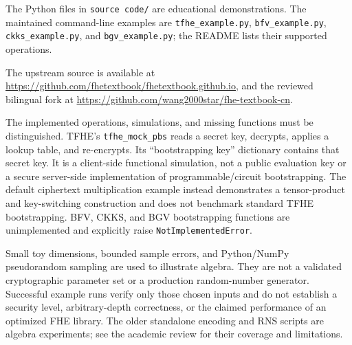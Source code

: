 The Python files in \texttt{source code/} are educational demonstrations. The maintained command-line examples are \texttt{tfhe\_example.py}, \texttt{bfv\_example.py}, \texttt{ckks\_example.py}, and \texttt{bgv\_example.py}; the README lists their supported operations.

The upstream source is available at \url{https://github.com/fhetextbook/fhetextbook.github.io}, and the reviewed bilingual fork at \url{https://github.com/wang2000star/fhe-textbook-cn}.

The implemented operations, simulations, and missing functions must be distinguished. TFHE's \texttt{tfhe\_mock\_pbs} reads a secret key, decrypts, applies a lookup table, and re-encrypts. Its ``bootstrapping key'' dictionary contains that secret key. It is a client-side functional simulation, not a public evaluation key or a secure server-side implementation of programmable/circuit bootstrapping. The default ciphertext multiplication example instead demonstrates a tensor-product and key-switching construction and does not benchmark standard TFHE bootstrapping. BFV, CKKS, and BGV bootstrapping functions are unimplemented and explicitly raise \texttt{NotImplementedError}.

Small toy dimensions, bounded sample errors, and Python/NumPy pseudorandom sampling are used to illustrate algebra. They are not a validated cryptographic parameter set or a production random-number generator. Successful example runs verify only those chosen inputs and do not establish a security level, arbitrary-depth correctness, or the claimed performance of an optimized FHE library. The older standalone encoding and RNS scripts are algebra experiments; see the academic review for their coverage and limitations.
